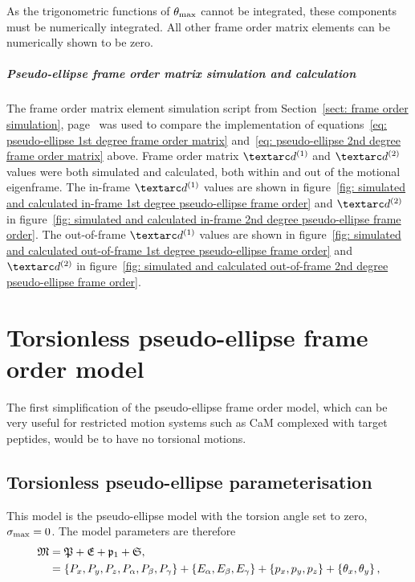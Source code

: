 As the trigonometric functions of $\theta_\textrm{max}$ cannot be integrated, these components must be numerically integrated.
All other frame order matrix elements can be numerically shown to be zero.


\subparagraph[Frame order matrix simulation and calculation]{Pseudo-ellipse frame order matrix simulation and calculation}

The frame order matrix element simulation script from Section~\ref{sect: frame order simulation}, page~\pageref{sect: frame order simulation} was used to compare the implementation of equations~\ref{eq: pseudo-ellipse 1st degree frame order matrix} and~\ref{eq: pseudo-ellipse 2nd degree frame order matrix} above.
Frame order matrix $\FOone$ and $\FOtwo$ values were both simulated and calculated, both within and out of the motional eigenframe.
The in-frame $\FOone$ values are shown in figure~\ref{fig: simulated and calculated in-frame 1st degree pseudo-ellipse frame order} and $\FOtwo$ in figure~\ref{fig: simulated and calculated in-frame 2nd degree pseudo-ellipse frame order}.
The out-of-frame $\FOone$ values are shown in figure~\ref{fig: simulated and calculated out-of-frame 1st degree pseudo-ellipse frame order} and $\FOtwo$ in figure~\ref{fig: simulated and calculated out-of-frame 2nd degree pseudo-ellipse frame order}.



\section{Torsionless pseudo-ellipse frame order model}

The first simplification of the pseudo-ellipse frame order model, which can be very useful for restricted motion systems such as CaM complexed with target peptides, would be to have no torsional motions.


\subsection{Torsionless pseudo-ellipse parameterisation}

This model is the pseudo-ellipse model with the torsion angle set to zero, $\sigma_\textrm{max} = 0$.
The model parameters are therefore
\begin{subequations}
\begin{align}
    \mathfrak{M} &= \mathfrak{P} + \mathfrak{E} + \mathfrak{p}_1 + \mathfrak{S}, \\
              &= \left\{ P_x, P_y, P_z, P_\alpha, P_\beta, P_\gamma \right\} + \left\{ E_\alpha, E_\beta, E_\gamma \right\} + \left\{ p_x, p_y, p_z \right\} + \left\{ \theta_x, \theta_y \right\} ,
\end{align}
\end{subequations}

